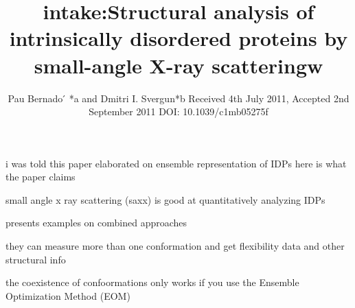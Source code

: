 \documentclass{article}
\title{intake:Structural analysis of intrinsically disordered proteins by small-angle X-ray scatteringw }
\subtitle{Pau Bernado ́ *a and Dmitri I. Svergun*b Received 4th July 2011, Accepted 2nd September 2011 DOI: 10.1039/c1mb05275f}
\begin{document}
i was told this paper elaborated on ensemble representation of IDPs
here is what the paper claims
\begin{items}
    \item small angle x ray scattering (saxx) is good at quantitatively analyzing IDPs 
    \item presents examples on combined approaches
    \item they can measure more than one conformation and get flexibility data and other structural info
    \item the coexistence of confoormations only works if you use the Ensemble Optimization Method (EOM)
\end{items}
\end{document}
